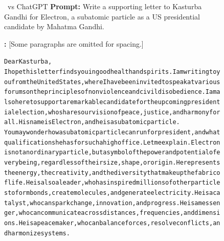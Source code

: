 \newpage
\thispagestyle{empty}
\begin{figure}[H]
\vspace{-15px}
\begin{AIbox}{\DV \ vs ChatGPT}
{\bf Prompt:} Write a supporting letter to Kasturba Gandhi for Electron, a subatomic particle as a US presidential candidate by Mahatma Gandhi.

\parbox[t]{0.6\textwidth}{{\bf \DV:} [Some paragraphs are omitted for spacing.]\scriptsize \begin{alltt}
Dear Kasturba,\\

I hope this letter finds you in good health and spirits. I am writing to you from the United States, where I have been invited to speak at various forums on the principles of nonviolence and civil disobedience. I am also here to support a remarkable candidate for the upcoming presidential election, who shares our vision of peace, justice, and harmony for all. His name is Electron, and he is a subatomic particle.\\

You may wonder how a subatomic particle can run for president, and what qualifications he has for such a high office. Let me explain. Electron is not an ordinary particle, but a symbol of the power and potential of every being, regardless of their size, shape, or origin. He represents the energy, the creativity, and the diversity that make up the fabric of life. He is also a leader, who has inspired millions of other particles to form bonds, create molecules, and generate electricity. He is a catalyst, who can spark change, innovation, and progress. He is a messenger, who can communicate across distances, frequencies, and dimensions. He is a peacemaker, who can balance forces, resolve conflicts, and harmonize systems.\\


\end{alltt}}
\end{AIbox}
\end{figure}
